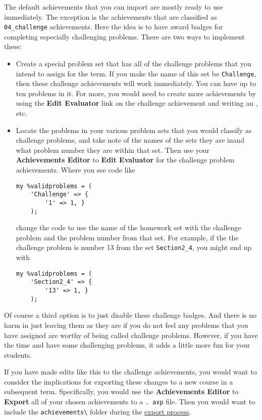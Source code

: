 \documentclass[12pt]{article}
\newcommand{\menu}[1]{\textbf{#1}}
\begin{document}
The default achievements that you can import are mostly ready to use immediately.
The exception is the achievements that are classified as \verb=04_challenge= achievements.
Here the idea is to have award badges for completing especially challenging problems.
There are two ways to implement these: \begin{itemize} \item Create a special problem set that has all of the challenge problems that you intend to assign for the term.
	      If you make the name of this set be \texttt{Challenge}, then these challenge achievements will work immediately.
	      You can have up to ten problems in it.
	      For more, you would need to create more achievements by using the \menu{Edit Evaluator} link on the  challenge achievement and writing an , etc.
	\item Locate the problems in your various problem sets that you would classify as challenge problems, and take note of the names of the sets they are inand what problem number they are within that set.
	      Then use your \menu{Achievements Editor} to \menu{Edit Evaluator} for the challenge problem achievements.
	      Where you see code like \begin{verbatim}
my %validproblems = (
	'Challenge' => {
	    '1' => 1, }
	);
	\end{verbatim} change the code to use the name of the homework set with the challenge problem and the problem number from that set.
	      For example, if the the challenge problem is number 13 from the set \verb=Section2_4=, you might end up with \begin{verbatim}
my %validproblems = (
	'Section2_4' => {
	    '13' => 1, }
	);
	\end{verbatim} \end{itemize}

Of course a third option is to just disable these challenge badges.
And there is no harm in just leaving them as they are if you do not feel any problems that you have assigned are worthy of being called challenge problems.
However, if you have the time and have some challenging problems, it adds a little more fun for your students.

If you have made edits like this to the challenge achievements, you would want to consider the implications for exporting these changes to a new course in a subsequent term.
Specifically, you would use the \menu{Achievements Editor} to \menu{Export} all of your chosen achievements to a \texttt{.
	axp} file.
Then you would want to include the \texttt{achievements\textbackslash} folder during the \hyperref[exp]{export process}.
\end{document}
